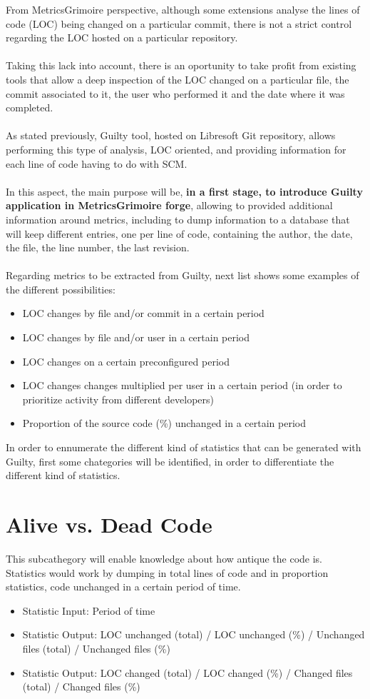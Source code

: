 \documentclass[11pt]{article}
\begin{document}
From MetricsGrimoire perspective, although some extensions analyse the lines of code (LOC) being changed on a particular commit, there is not a strict control regarding the LOC hosted on a particular repository.\\
\\
Taking this lack into account, there is an oportunity to take profit from existing tools that allow a deep inspection of the LOC changed on a particular file, the commit associated to it, the user who performed it and the date where it was completed.\\
\\
As stated previously, Guilty tool, hosted on Libresoft Git repository, allows performing this type of analysis, LOC oriented, and providing information for each line of code having to do with SCM.\\
\\
In this aspect, the main purpose will be, \textbf{in a first stage, to introduce Guilty application in MetricsGrimoire forge}, allowing to provided additional information  around metrics, including to dump information to a database that will keep different entries, one per line of code, containing the author, the date, the file, the line number, the last revision.\\
\\
Regarding metrics to be extracted from Guilty, next list shows some examples of the different possibilities:
\begin{itemize}
\item{LOC changes by file and/or commit in a certain period}
\item{LOC changes by file and/or user in a certain period}
\item{LOC changes on a certain preconfigured period}
\item{LOC changes changes multiplied per user in a certain period} (in order to prioritize activity from different developers)
\item{Proportion of the source code (\%) unchanged in a certain period}
\end{itemize}

In order to ennumerate the different kind of statistics that can be generated with Guilty, first some chategories will be identified, in order to differentiate the different kind of statistics.

\section{Alive vs. Dead Code}
This subcathegory will enable knowledge about how antique the code is. Statistics would work by dumping in total lines of code and in proportion statistics, code unchanged in a certain period of time.
\begin{itemize}
\item{Statistic Input}:  Period of time
\item{Statistic Output}: LOC unchanged (total) / LOC unchanged (\%) / Unchanged files (total) / Unchanged files (\%)
\item{Statistic Output}: LOC changed (total) / LOC changed (\%) / Changed files (total) / Changed files (\%)
\end{itemize}
\end{document}
